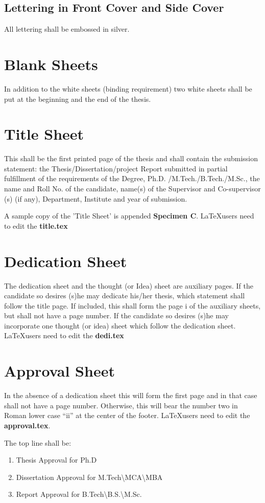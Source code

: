 \subsection{Lettering in Front Cover and Side Cover}
All lettering shall be embossed in silver.
\section{Blank Sheets}
In addition to the white sheets (binding requirement) two white sheets shall be put at the beginning and the end of the thesis.
\section {Title Sheet}
This shall be the first printed page of the thesis and shall contain the submission statement: the Thesis/Dissertation/project Report submitted in partial fulfillment of the requirements of the Degree, Ph.D. /M.Tech./B.Tech./M.Sc., the name and Roll No. of the candidate, name(s) of the Supervisor and Co-supervisor (s) (if any), Department, Institute and year of submission.
\par A sample copy of the 'Title Sheet' is appended \textbf{Specimen C}. \LaTeX users need to edit the \textbf{title.tex}

\section{Dedication Sheet}
The dedication sheet and the thought (or Idea) sheet are auxiliary pages. If the candidate so desires (s)he may dedicate his/her thesis, which statement shall follow the title page. If included, this shall form the page i of the auxiliary sheets,  but shall not have a page number. If the candidate so desires (s)he may incorporate one thought (or idea) sheet which follow the dedication sheet. \LaTeX users need to edit the \textbf{dedi.tex}

\section{Approval Sheet}
In the absence of a dedication sheet this will form the first page and in that case shall not have a page number. Otherwise, this will bear the number two in Roman lower case “ii” at the center of the footer. \LaTeX users need to edit the \textbf{approval.tex}.

The top line shall be:
\begin{enumerate}
	\item Thesis Approval for Ph.D
	\item Dissertation Approval for M.Tech\textbackslash MCA\textbackslash MBA
	\item Report Approval for B.Tech\textbackslash B.S.\textbackslash M.Sc. 
\end{enumerate}

